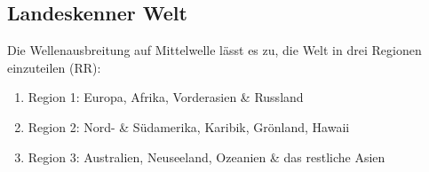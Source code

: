 \documentclass[11pt,BCOR=8.5mm]{scrartcl}
\begin{document}
\subsection{Landeskenner Welt}\label{sec:landeskenner_welt}

Die Wellenausbreitung auf Mittelwelle lässt es zu, die Welt in drei
Regionen einzuteilen (RR):
\begin{enumerate}
  \item Region 1: Europa, Afrika, Vorderasien \& Russland
  \item Region 2: Nord- \& Südamerika, Karibik, Grönland, Hawaii
  \item Region 3: Australien, Neuseeland, Ozeanien \& das restliche
	Asien
\end{enumerate}

\end{document}
